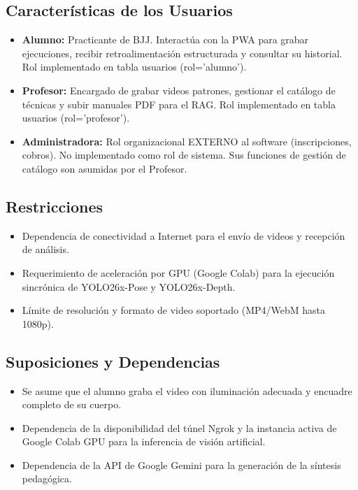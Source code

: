 \subsection{Características de los Usuarios}
\begin{itemize}
    \item \textbf{Alumno:} Practicante de BJJ. Interactúa con la PWA para grabar ejecuciones, recibir retroalimentación estructurada y consultar su historial. Rol implementado en tabla usuarios (rol='alumno').
    \item \textbf{Profesor:} Encargado de grabar videos patrones, gestionar el catálogo de técnicas y subir manuales PDF para el RAG. Rol implementado en tabla usuarios (rol='profesor').
    \item \textbf{Administradora:} Rol organizacional EXTERNO al software (inscripciones, cobros). No implementado como rol de sistema. Sus funciones de gestión de catálogo son asumidas por el Profesor.
\end{itemize}

\subsection{Restricciones}
\begin{itemize}
    \item Dependencia de conectividad a Internet para el envío de videos y recepción de análisis.
    \item Requerimiento de aceleración por GPU (Google Colab) para la ejecución sincrónica de YOLO26x-Pose y YOLO26x-Depth.
    \item Límite de resolución y formato de video soportado (MP4/WebM hasta 1080p).
\end{itemize}

\subsection{Suposiciones y Dependencias}
\begin{itemize}
    \item Se asume que el alumno graba el video con iluminación adecuada y encuadre completo de su cuerpo.
    \item Dependencia de la disponibilidad del túnel Ngrok y la instancia activa de Google Colab GPU para la inferencia de visión artificial.
    \item Dependencia de la API de Google Gemini para la generación de la síntesis pedagógica.
\end{itemize}

